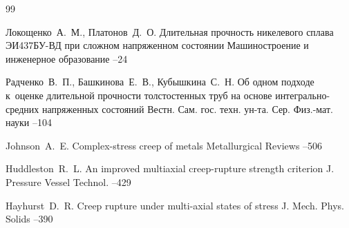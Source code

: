 


\begin{thebibliography}{99}

\by Локощенко~А.~М., Платонов~Д.~О.
\paper Длительная прочность никелевого сплава ЭИ437БУ-ВД при сложном напряженном состоянии
\jour Машиностроение и инженерное образование
--24

\by Радченко~В.~П., Башкинова~Е.~В., Кубышкина~С.~Н.
\paper Об одном подходе к~оценке длительной прочности толстостенных труб на основе интегрально-средних напряженных состояний
\jour Вестн. Сам. гос. техн. ун-та. Сер. Физ.-мат. науки
--104

\by Johnson~A.~E.
\paper Complex-stress creep of metals
\jour Metallurgical Reviews
--506

\by Huddleston~R.~L. 
\paper An improved multiaxial creep-rupture strength criterion
\jour J. Pressure Vessel Technol.
--429

\by Hayhurst~D.~R. 
\paper Creep rupture under multi-axial states of stress
\jour J. Mech. Phys. Solids
--390


\end{thebibliography}
